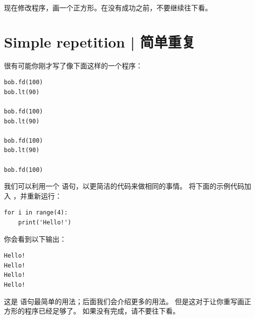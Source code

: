 
现在修改程序，画一个正方形。在没有成功之前，不要继续往下看。



\section{Simple repetition  |  简单重复}
\label{repetition}
  


很有可能你刚才写了像下面这样的一个程序：

\begin{lstlisting}
bob.fd(100)
bob.lt(90)

bob.fd(100)
bob.lt(90)

bob.fd(100)
bob.lt(90)

bob.fd(100)
\end{lstlisting}


我们可以利用一个  语句，以更简洁的代码来做相同的事情。
将下面的示例代码加入  ，并重新运行：
    

\begin{lstlisting}
for i in range(4):
    print('Hello!')
\end{lstlisting}


你会看到以下输出：

\begin{lstlisting}
Hello!
Hello!
Hello!
Hello!
\end{lstlisting}


这是  语句最简单的用法；后面我们会介绍更多的用法。
但是这对于让你重写画正方形的程序已经足够了。 如果没有完成，请不要往下看。

